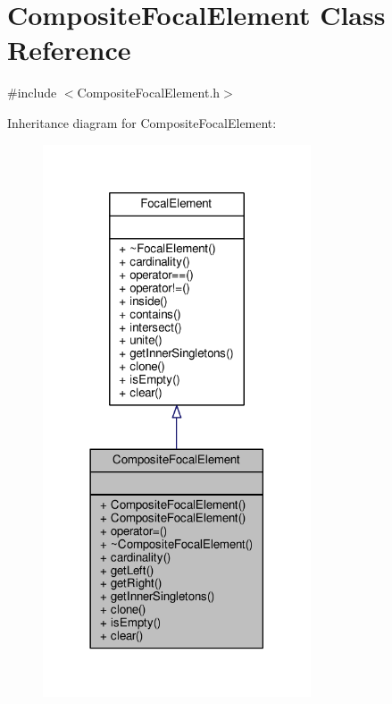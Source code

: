\hypertarget{classCompositeFocalElement}{}\section{Composite\+Focal\+Element Class Reference}
\label{classCompositeFocalElement}


{\ttfamily \#include $<$Composite\+Focal\+Element.\+h$>$}



Inheritance diagram for Composite\+Focal\+Element\+:\nopagebreak
\begin{figure}[H]
\begin{center}
\leavevmode
\includegraphics[width=225pt]{classCompositeFocalElement__inherit__graph}
\end{center}
\end{figure}


